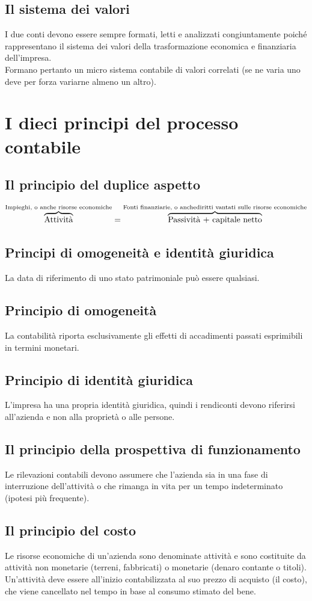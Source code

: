\documentclass{report}
\begin{document}
	\subsection{Il sistema dei valori}
	I due conti devono essere sempre formati, letti e analizzati congiuntamente poiché rappresentano il sistema dei valori della trasformazione economica e finanziaria dell'impresa.
	\medskip \\Formano pertanto un micro sistema contabile di valori correlati (se ne varia uno deve per forza variarne almeno un altro).
	\section{I dieci principi del processo contabile}
	\subsection{Il principio del duplice aspetto}
	\[
	\overbrace{\text{Attività}}^\text{Impieghi, o anche risorse economiche} = \overbrace{\text{Passività + capitale netto}}^\text{Fonti finanziarie, o anche\\diritti vantati sulle risorse economiche}
	\]
	\subsection{Principi di omogeneità e identità giuridica}
	La data di riferimento di uno stato patrimoniale può essere qualsiasi.
	\subsection{Principio di omogeneità} La contabilità riporta esclusivamente gli effetti di accadimenti passati esprimibili in termini monetari.
	\subsection{Principio di identità giuridica} L'impresa ha una propria identità giuridica, quindi i rendiconti devono riferirsi all'azienda e non alla proprietà o alle persone.
	\subsection{Il principio della prospettiva di funzionamento}
	Le rilevazioni contabili devono assumere che l'azienda sia in una fase di interruzione dell'attività o che rimanga in vita per un tempo indeterminato (ipotesi più frequente).
	\subsection{Il principio del costo}
	Le risorse economiche di un'azienda sono denominate attività e sono costituite da attività non monetarie (terreni, fabbricati) o monetarie (denaro contante o titoli).
	\medskip \\Un'attività deve essere all'inizio contabilizzata al suo prezzo di acquisto (il costo), che viene cancellato nel tempo in base al consumo stimato del bene.
\end{document}
